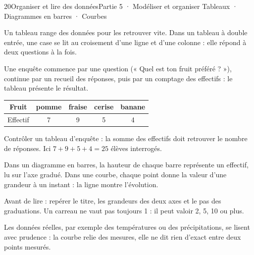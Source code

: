 \begin{ouverture}[statistiques]{20}{Organiser et lire des données}{Partie 5 · Modéliser et organiser}
{Tableaux · Diagrammes en barres · Courbes}
\end{ouverture}
\pagestyle{otMain}\essentiel\fontsize{11}{15}\selectfont
{}\label{cours-20-1}
\begin{definition}Un tableau range des données pour les retrouver vite. Dans un tableau à double entrée, une case se lit au croisement d’une ligne et d’une colonne : elle répond à deux questions à la fois.\end{definition}
\begin{exemple}Une enquête commence par une question (« Quel est ton fruit préféré ? »), continue par un recueil des réponses, puis par un comptage des effectifs : le tableau présente le résultat.\end{exemple}\begin{center}\renewcommand{\arraystretch}{1.35}\begin{tabular}{c|cccc}\toprule
Fruit & pomme & fraise & cerise & banane\\\midrule
Effectif & 7 & 9 & 5 & 4\\
\bottomrule\end{tabular}\end{center}
\begin{savoirfaire}Contrôler un tableau d’enquête : la somme des effectifs doit retrouver le nombre de réponses. Ici $7+9+5+4=25$ élèves interrogés.\end{savoirfaire}
\clearpage
{}\label{cours-20-2}
\begin{definition}Dans un diagramme en barres, la hauteur de chaque barre représente un effectif, lu sur l’axe gradué. Dans une courbe, chaque point donne la valeur d’une grandeur à un instant : la ligne montre l’évolution.\end{definition}
\label{fig-cours-20-2-cours-donnees}

\begin{savoirfaire}Avant de lire : repérer le titre, les grandeurs des deux axes et le pas des graduations. Un carreau ne vaut pas toujours 1 : il peut valoir 2, 5, 10 ou plus.\end{savoirfaire}
\begin{attention}Les données réelles, par exemple des températures ou des précipitations, se lisent avec prudence : la courbe relie des mesures, elle ne dit rien d’exact entre deux points mesurés.\end{attention}

